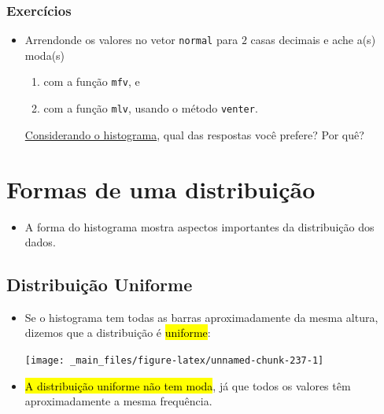 \documentclass[
  11pt]{report}
\providecommand{\tightlist}{%
  \setlength{\itemsep}{0pt}\setlength{\parskip}{0pt}}
\begin{document}
\hypertarget{exercuxedcios-7}{%
\subsubsection{Exercícios}\label{exercuxedcios-7}}

\begin{itemize}
\item
  Arrendonde os valores no vetor \texttt{normal} para $2$ casas decimais e ache a(s) moda(s)

  \begin{enumerate}
  \def\labelenumi{\arabic{enumi}.}
  \item
    com a função \texttt{mfv}, e
  \item
    com a função \texttt{mlv}, usando o método \texttt{venter}.
  \end{enumerate}

  \protect\hyperlink{dados-normais}{Considerando o histograma}, qual das respostas você prefere? Por quê?
\end{itemize}

\hypertarget{formas-de-uma-distribuiuxe7uxe3o}{%
\section{Formas de uma distribuição}\label{formas-de-uma-distribuiuxe7uxe3o}}

\begin{itemize}
\tightlist
\item
  A forma do histograma mostra aspectos importantes da distribuição dos dados.
\end{itemize}

\hypertarget{distribuiuxe7uxe3o-uniforme}{%
\subsection{Distribuição Uniforme}\label{distribuiuxe7uxe3o-uniforme}}

\begin{itemize}
\item
  Se o histograma tem todas as barras aproximadamente da mesma altura, dizemos que a distribuição é {\hl{uniforme}}:

  \begin{center}\texttt{[image: \_main\_files/figure-latex/unnamed-chunk-237-1]} \end{center}
\item
  {\hl{A distribuição uniforme não tem moda}}, já que todos os valores têm aproximadamente a mesma frequência.
\end{itemize}
\end{document}
